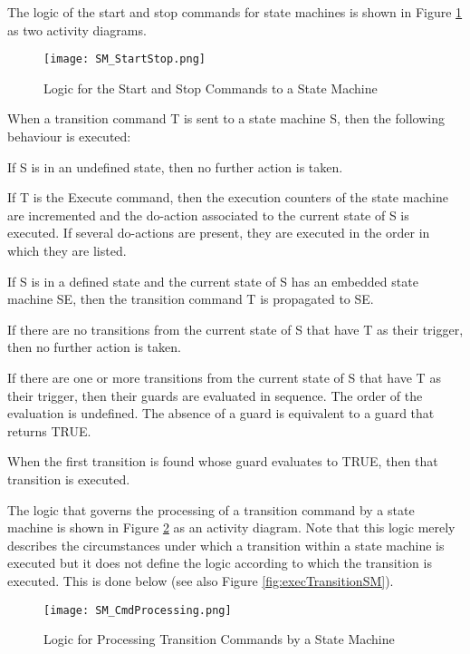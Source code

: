 The logic of the start and stop commands for state machines is shown in Figure \ref{fig:logicStartStopCmdSM} as two activity diagrams.

\begin{figure}[ht]
 \centering
 \texttt{[image: SM\_StartStop.png]}
 \caption{Logic for the Start and Stop Commands to a State Machine}
 \label{fig:logicStartStopCmdSM}
\end{figure}

When a transition command T is sent to a state machine S, then the following behaviour is executed:

\begin{fw_enumerate}
\item If S is in an undefined state, then no further action is taken.
\item If T is the Execute command, then the execution counters of the state machine are
incremented and the do-action associated to the current state of S is
executed. If several do-actions are present, they are executed in the order in which
they are listed.
\item If S is in a defined state and the current state of S has an embedded state machine SE,
then the transition command T is propagated to SE.
\item If there are no transitions from the current state of S that have T as their trigger, then
no further action is taken.
\item If there are one or more transitions from the current state of S that have T as their
trigger, then their guards are evaluated in sequence. The order of the evaluation is
undefined. The absence of a guard is equivalent to a guard that returns TRUE.
\item When the first transition is found whose guard evaluates to TRUE, then that transition
is executed.
\end{fw_enumerate}

The logic that governs the processing of a transition command by a state machine is shown in Figure \ref{fig:logicTransitionCmdSM} as an activity diagram. 
Note that this logic merely describes the circumstances under which a transition within a state machine is executed but it does not define the logic 
according to which the transition is executed. This is done below (see also Figure \ref{fig:execTransitionSM}).

\begin{figure}[ht]
 \centering
 \texttt{[image: SM\_CmdProcessing.png]}
 \caption{Logic for Processing Transition Commands by a State Machine}
 \label{fig:logicTransitionCmdSM}
\end{figure}

